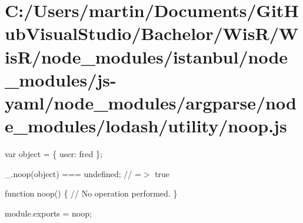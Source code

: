 \hypertarget{_c_1_2_users_2martin_2_documents_2_git_hub_visual_studio_2_bachelor_2_wis_r_2_wis_r_2node_modulec38dd94b1ad21e426f4d0a2645f977ab}{}\section{C\+:/\+Users/martin/\+Documents/\+Git\+Hub\+Visual\+Studio/\+Bachelor/\+Wis\+R/\+Wis\+R/node\+\_\+modules/istanbul/node\+\_\+modules/js-\/yaml/node\+\_\+modules/argparse/node\+\_\+modules/lodash/utility/noop.\+js}
var object = \{ \textquotesingle{}user\textquotesingle{}\+: \textquotesingle{}fred\textquotesingle{} \};

\+\_\+.\+noop(object) === undefined; // =$>$ true


\begin{DoxyCodeInclude}

\textcolor{keyword}{function} noop() \{
  \textcolor{comment}{// No operation performed.}
\}

module.exports = noop;
\end{DoxyCodeInclude}
 